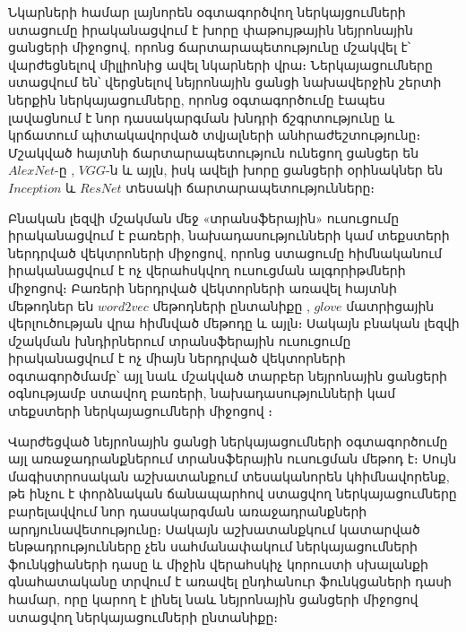 \documentclass[12pt]{article}
\begin{document}
\par Նկարների համար լայնորեն օգտագործվող ներկայցումների ստացումը իրականացվում է խորը փաթույթային  նեյրոնային ցանցերի միջոցով,  որոնց ճարտարապետությունը մշակվել է՝ վարժեցնելով միլլիոնից ավել նկարների վրա։ Ներկայացումները ստացվում են՝ վերցնելով նեյրոնային ցանցի նախավերջին շերտի ներքին ներկայացումները, որոնց օգտագործումը էապես լավացնում է նոր դասակարգման խնդրի ճշգրտությունը և կրճատում պիտակավորված տվյալների անհրաժեշտությունը։  Մշակված հայտնի ճարտարապետություն ունեցող  ցանցեր են $AlexNet$-ը \cite{bib_item_15}, $VGG$-ն \cite{bib_item_4} և այլն,  իսկ ավելի խորը ցանցերի օրինակներ են $Inception$ \cite{bib_item_16} և $ResNet$ \cite{bib_item_5} տեսակի ճարտարապետությունները։

Բնական լեզվի մշակման մեջ «տրանսֆերային» ուսուցումը իրականացվում է բառերի, նախադասությունների կամ տեքստերի ներդրված վեկտրոների միջոցով, որոնց ստացումը հիմնականում իրականացվում է  ոչ վերահսկվող ուսուցման ալգորիթմների միջոցով։ Բառերի ներդրված վեկտորների առավել հայտնի մեթոդներ են $word2vec$  մեթոդների ընտանիքը \cite{bib_item_18}, $glove$ մատրիցային վերլուծության վրա հիմնված մեթոդը \cite{bib_item_17} և այլն։ Սակայն բնական լեզվի մշակման խնդիրներում տրանսֆերային ուսուցումը իրականացվում է ոչ միայն ներդրված վեկտորների օգտագործմամբ՝ այլ նաև մշակված տարբեր նեյրոնային ցանցերի օգնությամբ ստավող բառերի, նախադասությունների կամ տեքստերի ներկայացումների միջոցով \cite{bib_item_19, bib_item_6}։
\par Վարժեցված նեյրոնային ցանցի ներկայացումների օգտագործումը այլ առաջադրանքներում տրանսֆերային ուսուցման մեթոդ է։ Սույն մագիստրոսական աշխատանքում տեսականորեն կհիմնավորենք, թե ինչու է փորձնական ճանապարհով ստացվող ներկայացումները բարելավվում նոր դասակարգման առաջադրանքների արդյունավետությունը։ Սակայն աշխատանքկում կատարված ենթադրությունները չեն սահմանափակում ներկայացումների ֆունկցիաների դասը և միջին վերահսկիչ կորուստի սխալանքի գնահատականը տրվում է առավել ընդհանուր ֆունկցաների դասի համար, որը կարող է լինել նաև նեյրոնային ցանցերի միջոցով ստացվող ներկայացումների ընտանիքը։
\end{document}
